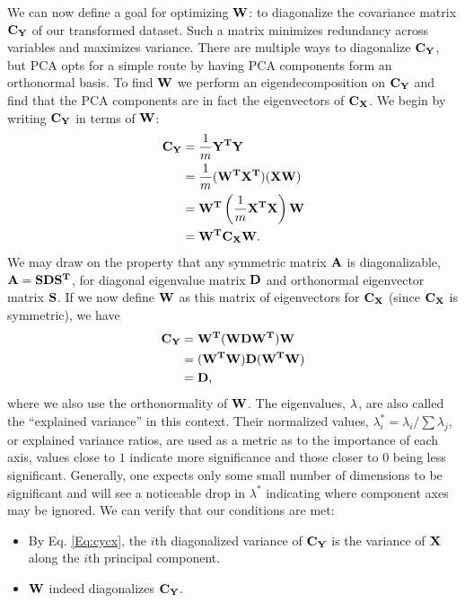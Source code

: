 We can now define a goal for optimizing $\mathbf{W}$: to diagonalize the covariance matrix $\mathbf{C_Y}$ of our transformed dataset. Such a matrix minimizes redundancy across variables and maximizes variance. There are multiple ways to diagonalize $\mathbf{C_Y}$, but PCA opts for a simple route by having PCA components form an orthonormal basis. 
To find $\mathbf{W}$ we perform an eigendecomposition on $\mathbf{C_Y}$ and find that the PCA components are in fact the eigenvectors of $\mathbf{C_X}$. We begin by writing $\mathbf{C_Y}$ in terms of $\mathbf{W}$:
\begin{align}
\nonumber	\mathbf{C_Y} &= \frac{1}{m}\mathbf{Y^TY}\\
\nonumber	&= \frac{1}{m}(\mathbf{W^TX^T})(\mathbf{XW})\\
\nonumber	&= \mathbf{W^T}\left(\frac{1}{m}\mathbf{X^TX}\right)\mathbf{W}\\
	&= \mathbf{W^TC_XW}.
\label{Eq:cycx}
\end{align}
We may draw on the property that any symmetric matrix $\mathbf{A}$ is diagonalizable, $\mathbf{A}=\mathbf{SDS^T}$, for diagonal eigenvalue matrix $\mathbf{D}$ and orthonormal eigenvector matrix $\mathbf{S}$. If we now define $\mathbf{W}$ as this matrix of eigenvectors for $\mathbf{C_X}$ (since $\mathbf{C_X}$ is symmetric), we have
\begin{align*}
	\mathbf{C_Y} &= \mathbf{W^T}(\mathbf{WDW^T})\mathbf{W}\\
	&= (\mathbf{W^TW})\mathbf{D}(\mathbf{W^TW})\\
	&= \mathbf{D},
\end{align*}
where we also use the orthonormality of $\mathbf{W}$. The eigenvalues, $\mathbf{\lambda}$, are also called the ``explained variance'' in this context. Their normalized values, $\lambda_i^* = \lambda_i/\sum\lambda_j$, or explained variance ratios, are used as a metric as to the importance of each axis, values close to $1$ indicate more significance and those closer to $0$ being less significant. Generally, one expects only some small number of dimensions to be significant and will see a noticeable drop in $\lambda^*$ indicating where component axes may be ignored.
We can verify that our conditions are met:
\begin{itemize}
	\item By Eq. \ref{Eq:cycx}, the $i$th diagonalized variance of $\mathbf{C_Y}$ is the variance of $\mathbf{X}$ along the $i$th principal component.
	\item $\mathbf{W}$ indeed diagonalizes $\mathbf{C_Y}$.
\end{itemize}

